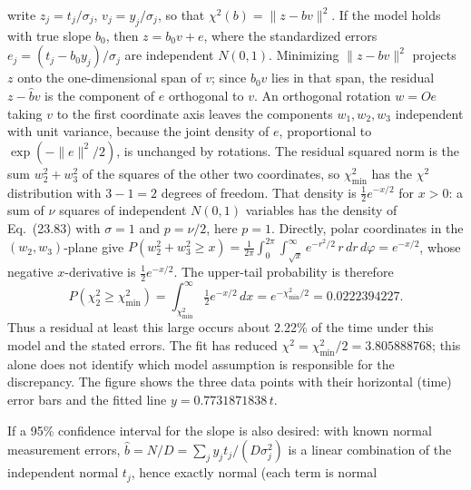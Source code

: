 write $z_j=t_j/\sigma_j$, $v_j=y_j/\sigma_j$, so that
$\chi^2(b)=\|z-bv\|^2$. If the model holds with true slope $b_0$, then
$z=b_0v+e$, where the standardized errors $e_j=(t_j-b_0y_j)/\sigma_j$
are independent $N(0,1)$. Minimizing $\|z-bv\|^2$ projects $z$ onto the
one-dimensional span of $v$; since $b_0v$ lies in that span, the
residual $z-\widehat bv$ is the component of $e$ orthogonal to $v$.
An orthogonal rotation $w=Oe$ taking $v$ to the first coordinate axis
leaves the components $w_1,w_2,w_3$ independent with unit variance,
because the joint density of $e$, proportional to $\exp(-\|e\|^2/2)$, is
unchanged by rotations. The residual squared norm is the sum
$w_2^2+w_3^2$ of the squares of the other two coordinates, so
$\chi^2_{\min}$ has the
$\chi^2$ distribution with $3-1=2$ degrees of freedom. That density is
$\frac12e^{-x/2}$ for $x>0$: a sum of $\nu$ squares of independent
$N(0,1)$ variables has the density of Eq.~(23.83) with $\sigma=1$ and
$p=\nu/2$, here $p=1$. Directly, polar coordinates in the
$(w_2,w_3)$-plane give
$P(w_2^2+w_3^2\ge x)=\frac1{2\pi}\int_0^{2\pi}\!\int_{\sqrt x}^\infty
e^{-r^2/2}\,r\,dr\,d\varphi=e^{-x/2}$, whose negative $x$-derivative is
$\frac12e^{-x/2}$. The upper-tail probability is therefore
\[
\boxed{P(\chi_2^2\ge\chi^2_{\min})
=\int_{\chi^2_{\min}}^\infty\tfrac12e^{-x/2}\,dx
=e^{-\chi^2_{\min}/2}=0.0222394227}.
\]
Thus a residual at least this large occurs about 2.22\% of the time
under this model and the stated errors. The fit has reduced
$\chi^2=\chi^2_{\min}/2=3.805888768$; this alone does not identify which
model assumption is responsible for the discrepancy.
The figure shows the three data points with their horizontal (time)
error bars and the fitted line $y=0.7731871838\,t$.
\begin{center}
\end{center}
If a 95\% confidence interval for the slope is also desired: with
known normal measurement errors,
$\widehat b=N/D=\sum_jy_jt_j/(D\sigma_j^2)$ is a linear combination of
the independent normal $t_j$, hence exactly normal (each term is normal
